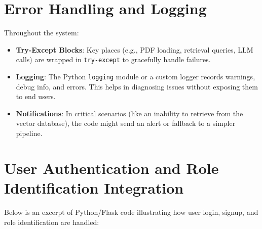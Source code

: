 \section{Error Handling and Logging}
\label{sec:error-logging}
Throughout the system:
\begin{itemize}
    \item \textbf{Try-Except Blocks}: Key places (e.g., PDF loading, retrieval queries, LLM calls) are wrapped in \texttt{try-except} to gracefully handle failures.
    \item \textbf{Logging}: The Python \texttt{logging} module or a custom logger records warnings, debug info, and errors. This helps in diagnosing issues without exposing them to end users.
    \item \textbf{Notifications}: In critical scenarios (like an inability to retrieve from the vector database), the code might send an alert or fallback to a simpler pipeline.
\end{itemize}

\section{User Authentication and Role Identification Integration}
\label{sec:auth-role}

Below is an excerpt of Python/Flask code illustrating how user login, signup, and role identification are handled:

